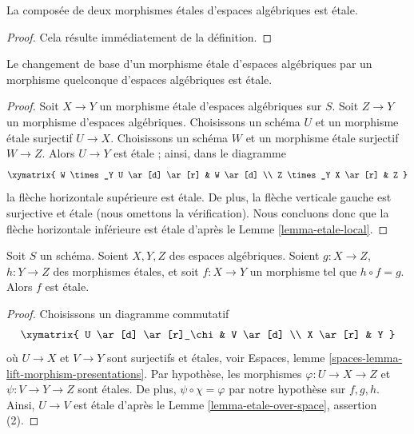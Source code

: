 \begin{lemma}
\label{lemma-composition-etale}
La composée de deux morphismes \'etales d'espaces algébriques
est \'etale.
\end{lemma}

\begin{proof}
Cela résulte immédiatement de la définition.
\end{proof}

\begin{lemma}
\label{lemma-base-change-etale}
Le changement de base d'un morphisme \'etale d'espaces algébriques
par un morphisme quelconque d'espaces algébriques est \'etale.
\end{lemma}

\begin{proof}
Soit $X \to Y$ un morphisme \'etale d'espaces algébriques sur $S$.
Soit $Z \to Y$ un morphisme d'espaces algébriques.
Choisissons un schéma $U$ et un morphisme \'etale surjectif $U \to X$.
Choisissons un schéma $W$ et un morphisme \'etale surjectif $W \to Z$.
Alors $U \to Y$ est \'etale ; ainsi, dans le diagramme
$$
\xymatrix{
W \times_Y U \ar[d] \ar[r] & W \ar[d] \\
Z \times_Y X \ar[r] & Z
}
$$
la flèche horizontale supérieure est \'etale.
De plus, la flèche verticale gauche est surjective
et \'etale (nous omettons la vérification). Nous concluons donc que la flèche
horizontale inférieure est \'etale d'après le Lemme \ref{lemma-etale-local}.
\end{proof}

\begin{lemma}
\label{lemma-etale-permanence}
Soit $S$ un schéma. Soient $X, Y, Z$ des espaces algébriques.
Soient $g : X \to Z$, $h : Y \to Z$ des morphismes \'etales, et soit
$f : X \to Y$ un morphisme tel que $h \circ f = g$.
Alors $f$ est \'etale.
\end{lemma}

\begin{proof}
Choisissons un diagramme commutatif
$$
\xymatrix{
U \ar[d] \ar[r]_\chi & V \ar[d] \\
X \ar[r] & Y
}
$$
où $U \to X$ et $V \to Y$ sont surjectifs et \'etales, voir
Espaces, lemme \ref{spaces-lemma-lift-morphism-presentations}.
Par hypothèse, les morphismes $\varphi : U \to X \to Z$ et
$\psi : V \to Y \to Z$ sont \'etales. De plus, $\psi \circ \chi = \varphi$
par notre hypothèse sur $f, g, h$.
Ainsi, $U \to V$ est \'etale d'après le Lemme \ref{lemma-etale-over-space},
assertion (2).
\end{proof}

